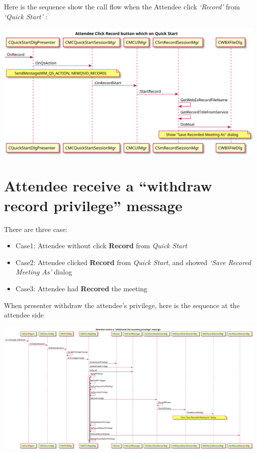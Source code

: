 \documentclass[letterpaper,10pt,english]{sphinxmanual}
\begin{document}
Here is the sequence show the call flow when the Attendee click \emph{`Record'} from \emph{`Quick Start'} :

\includegraphics{record_attendee_click_seq.svg}


\section{Attendee receive a ``withdraw record privilege'' message}
\label{record_logic:attendee-receive-a-withdraw-record-privilege-message}
There are three case:
\begin{itemize}
\item {} 
Case1: Attendee without click \textbf{Record} from \emph{Quick Start}

\item {} 
Case2: Attendee clicked \textbf{Record} from \emph{Quick Start}, and showed \emph{`Save Recored Meeting As'} dialog

\item {} 
Case3: Attendee had \textbf{Recored} the meeting

\end{itemize}

When presenter withdraw the attendee's privilege, here is the sequence at the attendee side

\includegraphics{record_attendee_withdrawal_privilege_seq.svg}
\end{document}

